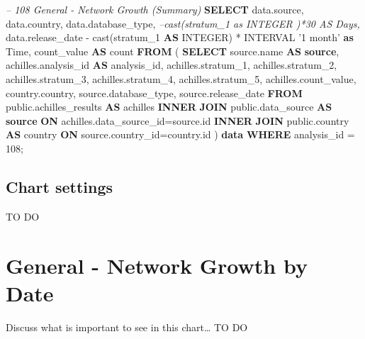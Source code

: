 \documentclass[]{book}
\newenvironment{Shaded}{\begin{snugshade}}{\end{snugshade}}
\newcommand{\KeywordTok}[1]{\textcolor[rgb]{0.13,0.29,0.53}{\textbf{#1}}}
\newcommand{\DataTypeTok}[1]{\textcolor[rgb]{0.13,0.29,0.53}{#1}}
\newcommand{\DecValTok}[1]{\textcolor[rgb]{0.00,0.00,0.81}{#1}}
\newcommand{\StringTok}[1]{\textcolor[rgb]{0.31,0.60,0.02}{#1}}
\newcommand{\CommentTok}[1]{\textcolor[rgb]{0.56,0.35,0.01}{\textit{#1}}}
\newcommand{\FunctionTok}[1]{\textcolor[rgb]{0.00,0.00,0.00}{#1}}
\newcommand{\NormalTok}[1]{#1}
\begin{document}
\begin{Shaded}
\begin{Highlighting}[]
\CommentTok{-- 108    General - Network Growth (Summary)}
\KeywordTok{SELECT}\NormalTok{ data.source,}
\NormalTok{       data.country,}
\NormalTok{       data.database_type,}
       \CommentTok{--cast(stratum_1 as INTEGER )*30 AS Days,}
\NormalTok{       data.release_date - }\FunctionTok{cast}\NormalTok{(stratum_1 }\KeywordTok{AS} \DataTypeTok{INTEGER}\NormalTok{) * }\DataTypeTok{INTERVAL} 
        \StringTok{'1 month'} \KeywordTok{as} \DataTypeTok{Time}\NormalTok{,}
\NormalTok{       count_value                   }\KeywordTok{AS} \FunctionTok{count}
\KeywordTok{FROM}\NormalTok{ (}
     \KeywordTok{SELECT}\NormalTok{ source.name              }\KeywordTok{AS} \KeywordTok{source}\NormalTok{,}
\NormalTok{            achilles.analysis_id     }\KeywordTok{AS}\NormalTok{ analysis_id,}
\NormalTok{            achilles.stratum_1,}
\NormalTok{            achilles.stratum_2,}
\NormalTok{            achilles.stratum_3,}
\NormalTok{            achilles.stratum_4,}
\NormalTok{            achilles.stratum_5,}
\NormalTok{            achilles.count_value,}
\NormalTok{            country.country,}
\NormalTok{            source.database_type, }
\NormalTok{            source.release_date}
     \KeywordTok{FROM}\NormalTok{ public.achilles_results }\KeywordTok{AS}\NormalTok{ achilles }\KeywordTok{INNER} \KeywordTok{JOIN} 
\NormalTok{      public.data_source }\KeywordTok{AS} \KeywordTok{source} \KeywordTok{ON}
\NormalTok{      achilles.data_source_id=source.id}
     \KeywordTok{INNER} \KeywordTok{JOIN}\NormalTok{ public.country }\KeywordTok{AS}\NormalTok{ country }\KeywordTok{ON} 
\NormalTok{      source.country_id=country.id}
\NormalTok{     ) }\KeywordTok{data}
\KeywordTok{WHERE}\NormalTok{ analysis_id = }\DecValTok{108}\NormalTok{;}
\end{Highlighting}
\end{Shaded}

\subsection{Chart settings}\label{chart-settings-3}

TO DO

\section{General - Network Growth by
Date}\label{general---network-growth-by-date}

Discuss what is important to see in this chart\ldots{} TO DO
\end{document}
